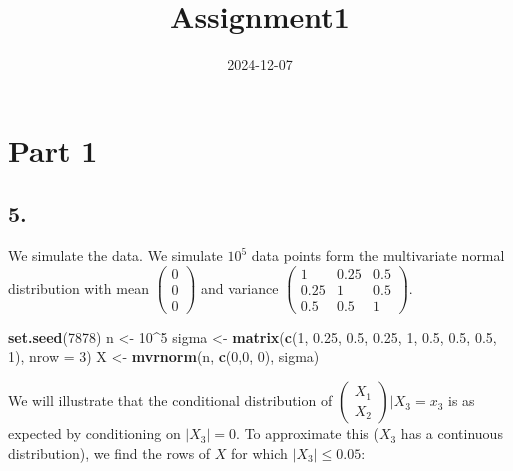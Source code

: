 \documentclass[
]{article}
\title{Assignment1}
\author{}
\date{\vspace{-2.5em}2024-12-07}
\newenvironment{Shaded}{\begin{snugshade}}{\end{snugshade}}
\newcommand{\AttributeTok}[1]{\textcolor[rgb]{0.13,0.29,0.53}{#1}}
\newcommand{\DecValTok}[1]{\textcolor[rgb]{0.00,0.00,0.81}{#1}}
\newcommand{\FloatTok}[1]{\textcolor[rgb]{0.00,0.00,0.81}{#1}}
\newcommand{\FunctionTok}[1]{\textcolor[rgb]{0.13,0.29,0.53}{\textbf{#1}}}
\newcommand{\NormalTok}[1]{#1}
\newcommand{\OtherTok}[1]{\textcolor[rgb]{0.56,0.35,0.01}{#1}}
\newcommand{\SpecialCharTok}[1]{\textcolor[rgb]{0.81,0.36,0.00}{\textbf{#1}}}
\begin{document}
\maketitle

\section{Part 1}\label{part-1}

\subsection{5.}\label{section}

We simulate the data. We simulate \(10^5\) data points form the
multivariate normal distribution with mean
\(\begin{pmatrix} 0 \\ 0 \\ 0 \end{pmatrix}\) and variance
\(\begin{pmatrix} 1 & 0.25 & 0.5 \\ 0.25 & 1 & 0.5 \\ 0.5 & 0.5 & 1 \end{pmatrix}\).

\begin{Shaded}
\begin{Highlighting}[]
\FunctionTok{set.seed}\NormalTok{(}\DecValTok{7878}\NormalTok{)}
\NormalTok{n }\OtherTok{\textless{}{-}} \DecValTok{10}\SpecialCharTok{\^{}}\DecValTok{5}
\NormalTok{sigma }\OtherTok{\textless{}{-}} \FunctionTok{matrix}\NormalTok{(}\FunctionTok{c}\NormalTok{(}\DecValTok{1}\NormalTok{, }\FloatTok{0.25}\NormalTok{, }\FloatTok{0.5}\NormalTok{, }\FloatTok{0.25}\NormalTok{, }\DecValTok{1}\NormalTok{, }\FloatTok{0.5}\NormalTok{, }\FloatTok{0.5}\NormalTok{, }\FloatTok{0.5}\NormalTok{, }\DecValTok{1}\NormalTok{), }\AttributeTok{nrow =} \DecValTok{3}\NormalTok{)}
\NormalTok{X }\OtherTok{\textless{}{-}} \FunctionTok{mvrnorm}\NormalTok{(n, }\FunctionTok{c}\NormalTok{(}\DecValTok{0}\NormalTok{,}\DecValTok{0}\NormalTok{, }\DecValTok{0}\NormalTok{), sigma)}
\end{Highlighting}
\end{Shaded}

We will illustrate that the conditional distribution of
\(\begin{pmatrix} X_1 \\ X_2 \end{pmatrix} \vert X_3 = x_3\) is as
expected by conditioning on \(|X_3| = 0\). To approximate this (\(X_3\)
has a continuous distribution), we find the rows of \(X\) for which
\(|X_3| \leq 0.05\):
\end{document}
